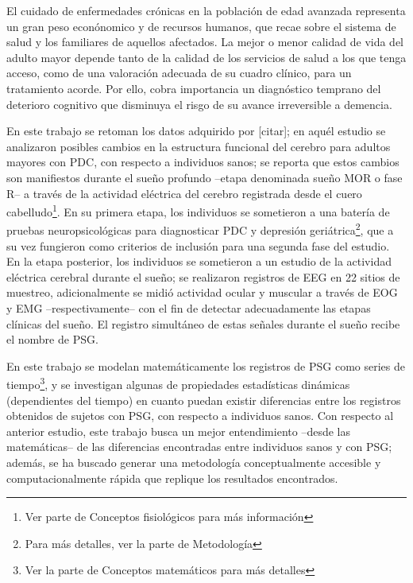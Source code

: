 El cuidado de enfermedades cr\'onicas 
en la poblaci\'on de edad avanzada representa un gran peso
econ\'onomico y de recursos humanos, que
recae sobre el sistema de salud y los familiares de aquellos afectados. 
La mejor o menor calidad 
de vida del adulto mayor depende tanto de la calidad de los servicios de salud a los que tenga
acceso, como de una valoraci\'on adecuada de su cuadro cl\'inico, para un tratamiento acorde.
Por ello, cobra importancia un diagn\'ostico temprano del deterioro cognitivo que disminuya
el risgo de su avance irreversible a demencia.


En este trabajo se retoman los datos adquirido por [citar]; en aqu\'el estudio se analizaron
posibles cambios en la estructura funcional del cerebro para adultos mayores con PDC, con 
respecto a individuos sanos; se reporta que estos cambios son manifiestos durante el sue\~no
profundo --etapa denominada sue\~no MOR o fase R-- 
a trav\'es de la actividad el\'ectrica del cerebro registrada desde el cuero 
cabelludo\footnote{Ver parte de Conceptos fisiol\'ogicos para m\'as informaci\'on}. 
En su primera etapa,
los individuos se sometieron a una bater\'ia de pruebas
neuropsicol\'ogicas para diagnosticar PDC y depresi\'on geri\'atrica\footnote{Para
m\'as detalles, ver la parte de Metodolog\'ia}, que a su vez fungieron como criterios de
inclusi\'on para una segunda fase del estudio.
En la etapa posterior, los individuos se sometieron a un estudio de la
actividad el\'ectrica cerebral durante el
sue\~no; se realizaron
registros de EEG en 22 sitios de muestreo, adicionalmente se midi\'o
actividad ocular y muscular a trav\'es de EOG y EMG --respectivamente-- con
el fin de detectar adecuadamente las etapas cl\'inicas del sue\~no\cite{AASM07}.
El registro simult\'aneo de estas se\~nales durante el sue\~no recibe el nombre de PSG.

En este trabajo se modelan matem\'aticamente los registros de PSG como series de 
tiempo\footnote{Ver la parte de Conceptos matem\'aticos para m\'as detalles}, y se
investigan algunas de propiedades estad\'isticas din\'amicas (dependientes del tiempo)
en cuanto puedan existir diferencias entre los registros obtenidos de sujetos con PSG,
con respecto a individuos sanos. 
Con respecto al anterior estudio, este trabajo busca un mejor
entendimiento --desde las matem\'aticas-- de las diferencias encontradas entre 
individuos sanos y con PSG; adem\'as, se ha buscado generar una metodolog\'ia 
conceptualmente accesible y computacionalmente r\'apida que replique los resultados encontrados.

